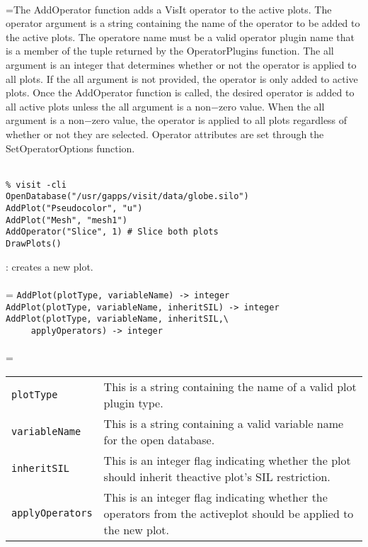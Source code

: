 \documentclass[10pt,a4paper]{report}
\begin{document}
 \\ 
\hangindent=\parindent The AddOperator function adds a VisIt operator to the active plots. The operator argument is a string containing the name of the operator to be added to the active plots. The operatore name must be a valid operator plugin name that is a member of the tuple returned by the OperatorPlugins function. The all argument is an integer that determines whether or not the operator is applied to all plots. If the all argument is not provided, the operator is only added to active plots. Once the AddOperator function is called, the desired operator is added to all active plots unless the all argument is a non$-$zero value. When the all argument is a non$-$zero value, the operator is applied to all plots regardless of whether or not they are selected. Operator attributes are set through the SetOperatorOptions function. \\[-3mm] 

\\[-6mm]
\begin{verbatim}% visit -cli
OpenDatabase("/usr/gapps/visit/data/globe.silo")
AddPlot("Pseudocolor", "u")
AddPlot("Mesh", "mesh1")
AddOperator("Slice", 1) # Slice both plots
DrawPlots()
\end{verbatim}
\newpage


{}
: creates a new plot.\\[-3mm]

 \\ 
\hangindent=\parindent 
\verb!AddPlot(plotType, variableName) -> integer!\\ 
\verb!AddPlot(plotType, variableName, inheritSIL) -> integer!\\
\verb!AddPlot(plotType, variableName, inheritSIL,\ ! \\ 
\verb!     applyOperators) -> integer!\\ [-3mm]

 \\ 
\hangindent=\parindent 
\begin{tabular}{lp{9cm}}
\verb!plotType! & This is a string containing the name of a valid plot plugin type. \\
\verb!variableName ! & This is a string containing a valid variable name for the open database. \\
\verb!inheritSIL! & This is an integer flag indicating whether the plot should inherit theactive plot's SIL restriction. \\
\verb!applyOperators! & This is an integer flag indicating whether the operators from the activeplot should be applied to the new plot. \\
\end{tabular} \\[-2mm]
\end{document}
